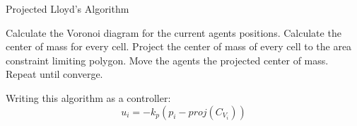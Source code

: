 \documentclass[t]{beamer}
\begin{document}
\begin{frame}[label=projlloydsalgo2]{Projected Lloyd's Algorithm}
\begin{algorithm}[H]
\caption{Projected Lloyd's Algorithm (PLA)}\label{ProjLloydsAlgorithm}
\begin{algorithmic}[1]
\State Calculate the Voronoi diagram for the current agents positions.
\State Calculate the center of mass for every cell.
\State Project the center of mass of every cell to the area constraint limiting polygon.
\State Move the agents the projected center of mass.
\State Repeat until converge.
\end{algorithmic}
\end{algorithm}

Writing this algorithm as a controller:
\begin{equation} \label{ProjectedLloydsContol}
u_{i} = -k_{p}\left( p_i - \textit{proj}\left( C_{V_{i}} \right) \right)
\end{equation} 
\end{frame}
\end{document}

